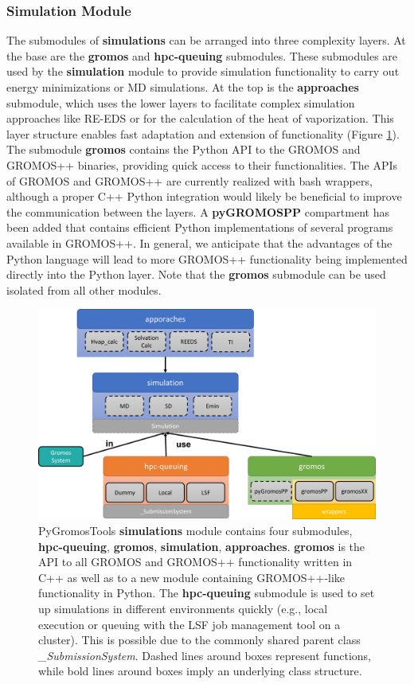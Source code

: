 \subsubsection{Simulation Module}
The submodules of \textbf{simulations} can be arranged into three complexity layers. At the base are the \textbf{gromos} and \textbf{hpc-queuing} submodules. These submodules are used by the \textbf{simulation} module to provide simulation functionality to carry out energy minimizations or MD simulations. At the top is the \textbf{approaches} submodule, which uses the lower layers to facilitate complex simulation approaches like RE-EDS or for the calculation of the heat of vaporization. This layer structure enables fast adaptation and extension of functionality (Figure \ref{fig: SimulationModule}).
%
The submodule \textbf{gromos} contains the Python API to the GROMOS\cite{Schmid2012} and GROMOS++\cite{Eichenberger2011} binaries, providing quick access to their functionalities. The APIs of GROMOS and GROMOS++ are currently realized with bash wrappers, although a proper C++ Python integration would likely be beneficial to improve the communication between the layers. A \textbf{pyGROMOSPP} compartment has been added that contains efficient Python implementations of several programs available in GROMOS++. In general, we anticipate that the advantages of the Python language will lead to more GROMOS++ functionality being implemented directly into the Python layer. Note that the \textbf{gromos} submodule can be used isolated from all other modules.

\begin{figure}[h]
    \centering
    \includegraphics[width=\textwidth]{fig/implementation/Simulation.png}
    \caption{PyGromosTools \textbf{simulations} module contains four submodules, \textbf{hpc-queuing}, \textbf{gromos}, \textbf{simulation}, \textbf{approaches}. \textbf{gromos} is the API to all GROMOS and GROMOS++ functionality written in C++ as well as to a new module containing GROMOS++-like functionality in Python. The \textbf{hpc-queuing} submodule is used to set up simulations in different environments quickly (e.g., local execution or queuing with the LSF job management tool on a cluster). This is possible due to the commonly shared parent class \textit{\_SubmissionSystem}. Dashed lines around boxes represent functions, while bold lines around boxes imply an underlying class structure.}
    \label{fig: SimulationModule}
\end{figure}

